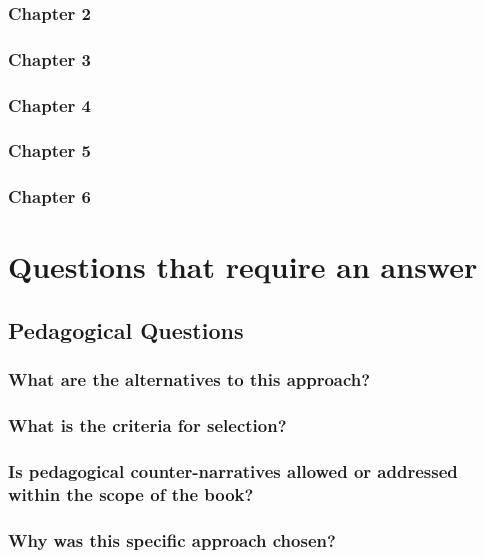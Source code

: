 \documentclass[12pt]{article}
\begin{document}
	\subsubsection{Chapter 2}
	\subsubsection{Chapter 3}
	\subsubsection{Chapter 4}
	\subsubsection{Chapter 5}
	\subsubsection{Chapter 6}

	\section{Questions that require an answer}
	\subsection{Pedagogical Questions}
	\subsubsection{What are the alternatives to this approach?}
	\subsubsection{What is the criteria for selection?}
	\subsubsection{Is pedagogical counter-narratives allowed or addressed within the scope of the book?}
	\subsubsection{Why was this specific approach chosen?}
\end{document}
